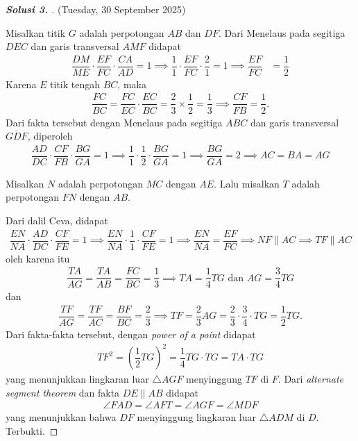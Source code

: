 \begin{proof}[\textbf{Solusi 3. }] (Tuesday, 30 September 2025)
    
    Misalkan titik $G$ adalah perpotongan $AB$ dan $DF$.
    Dari Menelaus pada segitiga $DEC$ dan garis transversal $\overline{AMF}$ didapat
    \begin{align*}
        \dfrac{DM}{ME}\cdot \dfrac{EF}{FC} \cdot \dfrac{CA}{AD} = 1 \implies
        \dfrac{1}{1}\cdot \dfrac{EF}{FC} \cdot \dfrac{2}{1} = 1 \implies
        \dfrac{EF}{FC} &= \dfrac{1}{2}
    \end{align*}
    Karena $E$ titik tengah $BC$, maka 
    \begin{align*}
        \dfrac{FC}{BC} = \dfrac{FC}{EC} \cdot \dfrac{EC}{BC} = \dfrac{2}{3} \times \dfrac{1}{2} = \dfrac{1}{3} \implies \dfrac{CF}{FB} = \dfrac{1}{2}.
    \end{align*}
    Dari fakta tersebut dengan Menelaus pada segitiga $ABC$ dan garis transversal $\overline{GDF}$, diperoleh
    \begin{align*}
        \dfrac{AD}{DC} \cdot \dfrac{CF}{FB} \cdot \dfrac{BG}{GA} = 1 \implies
        \dfrac{1}{1} \cdot \dfrac{1}{2} \cdot \dfrac{BG}{GA} = 1 \implies
        \dfrac{BG}{GA} = 2 \implies
        AC = BA = AG
    \end{align*}

    Misalkan $N$ adalah perpotongan $MC$ dengan $AE$. Lalu misalkan $T$ adalah perpotongan $FN$ dengan $AB$. 

    Dari dalil Ceva, didapat
    \begin{align*}
        \dfrac{EN}{NA} \cdot \dfrac{AD}{DC} \cdot \dfrac{CF}{FE} = 1 \implies \dfrac{EN}{NA} \cdot \dfrac{1}{1} \cdot \dfrac{CF}{FE} = 1 \implies \dfrac{EN}{NA} = \dfrac{EF}{FC} \implies NF \parallel AC \implies TF \parallel AC
    \end{align*}
    oleh karena itu
    \begin{align*}
        \dfrac{TA}{AG}=\dfrac{TA}{AB} = \dfrac{FC}{BC} = \dfrac{1}{3} \implies TA = \dfrac{1}{4} TG \text{ dan } AG = \dfrac{3}{4}TG
    \end{align*}
    dan
    \begin{align*}
        \dfrac{TF}{AG}=\dfrac{TF}{AC} = \dfrac{BF}{BC} = \dfrac{2}{3} \implies TF= \dfrac{2}{3}AG = \dfrac{2}{3} \cdot \dfrac{3}{4} \cdot TG = \dfrac{1}{2} TG.
    \end{align*}
    Dari fakta-fakta tersebut, dengan \textit{power of a point} didapat
    \begin{align*}
        TF^2 = \left(\dfrac{1}{2} TG\right)^2 = \dfrac{1}{4}TG \cdot TG = TA \cdot TG
    \end{align*}
    yang menunjukkan lingkaran luar $\triangle AGF$ menyinggung $TF$ di $F$. Dari \textit{alternate segment theorem} dan fakta $DE \parallel AB$ didapat 
    \begin{align*}
        \angle FAD = \angle AFT = \angle AGF = \angle MDF
    \end{align*}
    yang menunjukkan bahwa $DF$ menyinggung lingkaran luar $\triangle ADM$ di $D$. Terbukti.
\end{proof}
